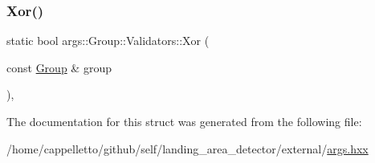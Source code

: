 \mbox{\label{structargs_1_1_group_1_1_validators_a7fcc24c227a52d1ec07a9abfb08e72b6}} 
\subsubsection{\texorpdfstring{Xor()}{Xor()}}
{\footnotesize\ttfamily static bool args\+::\+Group\+::\+Validators\+::\+Xor (\begin{DoxyParamCaption}\item[{const \hyperlink{classargs_1_1_group}{Group} \&}]{group }\end{DoxyParamCaption})\hspace{0.3cm}{\ttfamily [inline]}, {\ttfamily [static]}}



The documentation for this struct was generated from the following file\+:\begin{DoxyCompactItemize}
\item 
/home/cappelletto/github/self/landing\+\_\+area\+\_\+detector/external/\hyperlink{args_8hxx}{args.\+hxx}\end{DoxyCompactItemize}
